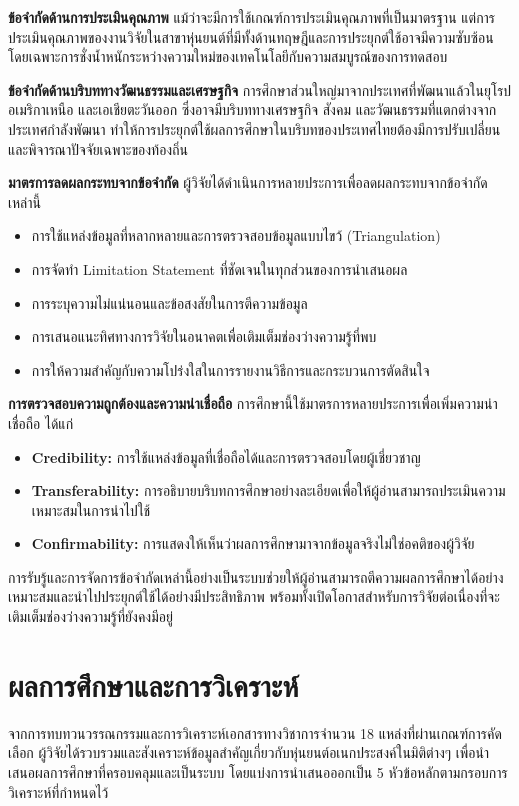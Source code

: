 \documentclass[a4paper]{article}
\begin{document}
\textbf{ข้อจำกัดด้านการประเมินคุณภาพ} แม้ว่าจะมีการใช้เกณฑ์การประเมินคุณภาพที่เป็นมาตรฐาน แต่การประเมินคุณภาพของงานวิจัยในสาขาหุ่นยนต์ที่มีทั้งด้านทฤษฎีและการประยุกต์ใช้อาจมีความซับซ้อน โดยเฉพาะการชั่งน้ำหนักระหว่างความใหม่ของเทคโนโลยีกับความสมบูรณ์ของการทดสอบ

\textbf{ข้อจำกัดด้านบริบททางวัฒนธรรมและเศรษฐกิจ} การศึกษาส่วนใหญ่มาจากประเทศที่พัฒนาแล้วในยุโรป อเมริกาเหนือ และเอเชียตะวันออก ซึ่งอาจมีบริบททางเศรษฐกิจ สังคม และวัฒนธรรมที่แตกต่างจากประเทศกำลังพัฒนา ทำให้การประยุกต์ใช้ผลการศึกษาในบริบทของประเทศไทยต้องมีการปรับเปลี่ยนและพิจารณาปัจจัยเฉพาะของท้องถิ่น

\textbf{มาตรการลดผลกระทบจากข้อจำกัด} ผู้วิจัยได้ดำเนินการหลายประการเพื่อลดผลกระทบจากข้อจำกัดเหล่านี้
\begin{itemize}
\item การใช้แหล่งข้อมูลที่หลากหลายและการตรวจสอบข้อมูลแบบไขว้ (Triangulation)
\item การจัดทำ Limitation Statement ที่ชัดเจนในทุกส่วนของการนำเสนอผล
\item การระบุความไม่แน่นอนและข้อสงสัยในการตีความข้อมูล
\item การเสนอแนะทิศทางการวิจัยในอนาคตเพื่อเติมเต็มช่องว่างความรู้ที่พบ
\item การให้ความสำคัญกับความโปร่งใสในการรายงานวิธีการและกระบวนการตัดสินใจ
\end{itemize}

\textbf{การตรวจสอบความถูกต้องและความน่าเชื่อถือ} การศึกษานี้ใช้มาตรการหลายประการเพื่อเพิ่มความน่าเชื่อถือ ได้แก่
\begin{itemize}
\item \textbf{Credibility:} การใช้แหล่งข้อมูลที่เชื่อถือได้และการตรวจสอบโดยผู้เชี่ยวชาญ
\item \textbf{Transferability:} การอธิบายบริบทการศึกษาอย่างละเอียดเพื่อให้ผู้อ่านสามารถประเมินความเหมาะสมในการนำไปใช้
\item \textbf{Confirmability:} การแสดงให้เห็นว่าผลการศึกษามาจากข้อมูลจริงไม่ใช่อคติของผู้วิจัย
\end{itemize}

การรับรู้และการจัดการข้อจำกัดเหล่านี้อย่างเป็นระบบช่วยให้ผู้อ่านสามารถตีความผลการศึกษาได้อย่างเหมาะสมและนำไปประยุกต์ใช้ได้อย่างมีประสิทธิภาพ พร้อมทั้งเปิดโอกาสสำหรับการวิจัยต่อเนื่องที่จะเติมเต็มช่องว่างความรู้ที่ยังคงมีอยู่
\newpage
\section{ผลการศึกษาและการวิเคราะห์}
จากการทบทวนวรรณกรรมและการวิเคราะห์เอกสารทางวิชาการจำนวน 18 แหล่งที่ผ่านเกณฑ์การคัดเลือก ผู้วิจัยได้รวบรวมและสังเคราะห์ข้อมูลสำคัญเกี่ยวกับหุ่นยนต์อเนกประสงค์ในมิติต่างๆ เพื่อนำเสนอผลการศึกษาที่ครอบคลุมและเป็นระบบ โดยแบ่งการนำเสนอออกเป็น 5 หัวข้อหลักตามกรอบการวิเคราะห์ที่กำหนดไว้
\end{document}
